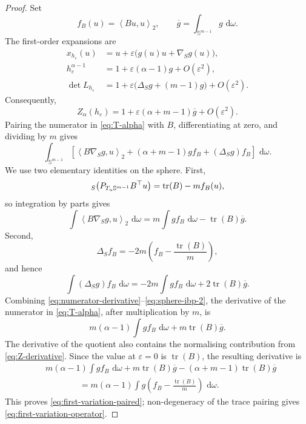 \documentclass[11pt,a4paper]{amsart}
\numberwithin{equation}{section}
\theoremstyle{plain}
\theoremstyle{definition}
\theoremstyle{remark}
\DeclareMathOperator{\tr}{tr}
\let\div\relax
\DeclareMathOperator{\div}{div}
\newcommand{\dd}{\,\mathrm{d}}
\newcommand{\sphere}{\mathbb{S}}
\newcommand{\ip}[2]{\left\langle #1,#2\right\rangle_2}
\begin{document}
\begin{proof}
Set
\[
f_B(u)=\ip{Bu}{u},
\qquad
\overline g=\int_{\sphere^{m-1}}g\,\dd\omega.
\]
The first-order expansions are
\begin{align*}
x_{h_\varepsilon}(u)
&=u+\varepsilon\big(g(u)u+\nabla_Sg(u)\big),\\
h_\varepsilon^{\alpha-1}
&=1+\varepsilon(\alpha-1)g+O(\varepsilon^2),\\
\det L_{h_\varepsilon}
&=1+\varepsilon\big(\Delta_Sg+(m-1)g\big)+O(\varepsilon^2).
\end{align*}
Consequently,
\begin{equation}\label{eq:Z-derivative}
Z_\alpha(h_\varepsilon)
=1+\varepsilon(\alpha+m-1)\overline g+O(\varepsilon^2).
\end{equation}
Pairing the numerator in \eqref{eq:T-alpha} with $B$, differentiating at zero, and dividing by $m$ gives
\begin{equation}\label{eq:numerator-derivative}
\int_{\sphere^{m-1}}
\left[
\ip{B\nabla_Sg}{u}
+(\alpha+m-1)gf_B
+(\Delta_Sg)f_B
\right]\,\dd\omega.
\end{equation}
We use two elementary identities on the sphere. First,
\[
\div_S\big(P_{T_u\sphere^{m-1}}B^\top u\big)
=\tr(B)-mf_B(u),
\]
so integration by parts gives
\begin{equation}\label{eq:sphere-ibp-1}
\int\ip{B\nabla_Sg}{u}\,\dd\omega
=m\int gf_B\,\dd\omega-\tr(B)\overline g.
\end{equation}
Second,
\[
\Delta_Sf_B=-2m\left(f_B-\frac{\tr(B)}m\right),
\]
and hence
\begin{equation}\label{eq:sphere-ibp-2}
\int(\Delta_Sg)f_B\,\dd\omega
=-2m\int gf_B\,\dd\omega+2\tr(B)\overline g.
\end{equation}
Combining \eqref{eq:numerator-derivative}--\eqref{eq:sphere-ibp-2}, the derivative of the numerator in \eqref{eq:T-alpha}, after multiplication by $m$, is
\[
m(\alpha-1)\int gf_B\,\dd\omega+m\tr(B)\overline g.
\]
The derivative of the quotient also contains the normalising contribution from \eqref{eq:Z-derivative}. Since the value at $\varepsilon=0$ is $\tr(B)$, the resulting derivative is
\begin{align*}
&m(\alpha-1)\int gf_B\,\dd\omega
+m\tr(B)\overline g
-(\alpha+m-1)\tr(B)\overline g\\
&\hspace{4em}=m(\alpha-1)\int g\left(f_B-\frac{\tr(B)}m\right)\,\dd\omega.
\end{align*}
This proves \eqref{eq:first-variation-paired}; non-degeneracy of the trace pairing gives \eqref{eq:first-variation-operator}.
\end{proof}
\end{document}
